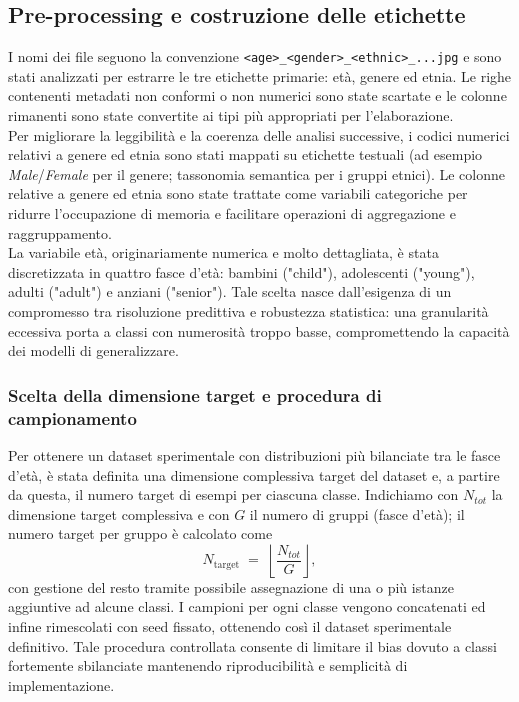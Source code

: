 \documentclass[a4paper,12pt]{report}
\begin{document}
	\subsection{Pre-processing e costruzione delle etichette}
	
	I nomi dei file seguono la convenzione \texttt{<age>\_<gender>\_<ethnic>\_...jpg} e sono stati analizzati per estrarre le tre etichette primarie: età, genere ed etnia. Le righe contenenti metadati non conformi o non numerici sono state scartate e le colonne rimanenti sono state convertite ai tipi più appropriati per l'elaborazione. \\
	Per migliorare la leggibilità e la coerenza delle analisi successive, i codici numerici relativi a genere ed etnia sono stati mappati su etichette testuali (ad esempio \textit{Male}/\textit{Female} per il genere; tassonomia semantica per i gruppi etnici). Le colonne relative a genere ed etnia sono state trattate come variabili categoriche per ridurre l'occupazione di memoria e facilitare operazioni di aggregazione e raggruppamento. \\
	La variabile età, originariamente numerica e molto dettagliata, è stata discretizzata in quattro fasce d'età: bambini ("child"), adolescenti ("young"), adulti ("adult") e anziani ("senior"). Tale scelta nasce dall'esigenza di un compromesso tra risoluzione predittiva e robustezza statistica: una granularità eccessiva porta a classi con numerosità troppo basse, compromettendo la capacità dei modelli di generalizzare.
	
	\subsubsection{Scelta della dimensione target e procedura di campionamento}
	Per ottenere un dataset sperimentale con distribuzioni più bilanciate tra le fasce d'età, è stata definita una dimensione complessiva target del dataset e, a partire da questa, il numero target di esempi per ciascuna classe. Indichiamo con \(N_{tot}\) la dimensione target complessiva e con \(G\) il numero di gruppi (fasce d'età); il numero target per gruppo è calcolato come
	\[
	N_{\text{target}} \;=\; \left\lfloor \frac{N_{tot}}{G} \right\rfloor,
	\]
	con gestione del resto tramite possibile assegnazione di una o più istanze aggiuntive ad alcune classi. I campioni per ogni classe vengono concatenati ed infine rimescolati con seed fissato, ottenendo così il dataset sperimentale definitivo. Tale procedura controllata consente di limitare il bias dovuto a classi fortemente sbilanciate mantenendo riproducibilità e semplicità di implementazione.
	
\end{document}
